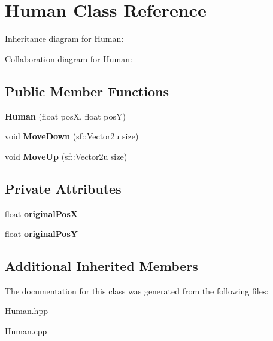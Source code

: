 \hypertarget{classHuman}{}\section{Human Class Reference}
\label{classHuman}


Inheritance diagram for Human\+:


Collaboration diagram for Human\+:
\subsection*{Public Member Functions}
\begin{DoxyCompactItemize}
\item 
\mbox{\label{classHuman_a9805f6e37c0c6b762ce9ab02f8a9054d}} 
{\bfseries Human} (float posX, float posY)
\item 
\mbox{\label{classHuman_a81a80ee8de2eb2917ab26590aae8d580}} 
void {\bfseries Move\+Down} (sf\+::\+Vector2u size)
\item 
\mbox{\label{classHuman_ac1c7b78f46f624cf8e636470bd793d41}} 
void {\bfseries Move\+Up} (sf\+::\+Vector2u size)
\end{DoxyCompactItemize}
\subsection*{Private Attributes}
\begin{DoxyCompactItemize}
\item 
\mbox{\label{classHuman_a6620e7b4dc6671361265f5388e06bac8}} 
float {\bfseries original\+PosX}
\item 
\mbox{\label{classHuman_ae683e562ec3843929f052b82410c14a8}} 
float {\bfseries original\+PosY}
\end{DoxyCompactItemize}
\subsection*{Additional Inherited Members}


The documentation for this class was generated from the following files\+:\begin{DoxyCompactItemize}
\item 
Human.\+hpp\item 
Human.\+cpp\end{DoxyCompactItemize}
